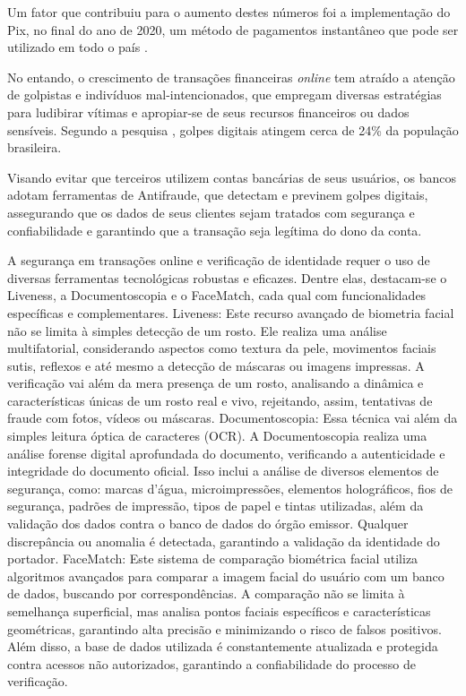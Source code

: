 Um fator que contribuiu para o aumento destes números foi a implementação do Pix, no final do ano de 2020, um método de pagamentos instantâneo que pode ser utilizado em todo o país \cite{febraban2024}.

No entando, o crescimento de transações financeiras \textit{online} tem atraído a atenção de golpistas e indivíduos mal-intencionados, que empregam diversas estratégias para ludibirar vítimas e apropiar-se de seus recursos financeiros ou dados sensíveis. Segundo a pesquisa \cite{datasenado}, golpes digitais atingem cerca de 24\% da população brasileira.

Visando evitar que terceiros utilizem contas bancárias de seus usuários, os bancos adotam ferramentas de Antifraude, que detectam e previnem golpes digitais, assegurando que os dados de seus clientes sejam tratados com segurança e confiabilidade e garantindo que a transação seja legítima do dono da conta.

A segurança em transações online e verificação de identidade requer o uso de diversas ferramentas tecnológicas robustas e eficazes. Dentre elas, destacam-se o Liveness, a Documentoscopia e o FaceMatch, cada qual com funcionalidades específicas e complementares. Liveness: Este recurso avançado de biometria facial não se limita à simples detecção de um rosto. Ele realiza uma análise multifatorial, considerando aspectos como textura da pele, movimentos faciais sutis, reflexos e até mesmo a detecção de máscaras ou imagens impressas. A verificação vai além da mera presença de um rosto, analisando a dinâmica e características únicas de um rosto real e vivo, rejeitando, assim, tentativas de fraude com fotos, vídeos ou máscaras. Documentoscopia: Essa técnica vai além da simples leitura óptica de caracteres (OCR). A Documentoscopia realiza uma análise forense digital aprofundada do documento, verificando a autenticidade e integridade do documento oficial. Isso inclui a análise de diversos elementos de segurança, como: marcas d'água, microimpressões, elementos holográficos, fios de segurança, padrões de impressão, tipos de papel e tintas utilizadas, além da validação dos dados contra o banco de dados do órgão emissor. Qualquer discrepância ou anomalia é detectada, garantindo a validação da identidade do portador. FaceMatch: Este sistema de comparação biométrica facial utiliza algoritmos avançados para comparar a imagem facial do usuário com um banco de dados, buscando por correspondências. A comparação não se limita à semelhança superficial, mas analisa pontos faciais específicos e características geométricas, garantindo alta precisão e minimizando o risco de falsos positivos. Além disso, a base de dados utilizada é constantemente atualizada e protegida contra acessos não autorizados, garantindo a confiabilidade do processo de verificação.

